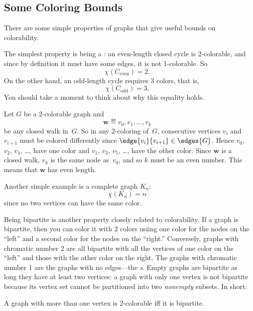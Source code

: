 \subsection{Some Coloring Bounds}

There are some simple properties of graphs that give useful bounds on
colorability. 
\begin{editingnotes}
\end{editingnotes} The simplest property is being a : an even-length
closed cycle is 2-colorable, and since by definition it must have some
edges, it is not 1-colorable.  So
\[
\chi(C_{\text{even}}) = 2.
\]
On the other hand, an odd-length cycle requires 3 colors, that is,
\begin{equation}\label{Codd3}
\chi(C_{\text{odd}}) = 3.
\end{equation}
You should take a moment to think about why this equality holds.
\begin{editingnotes}

Let $G$ be a 2-colorable graph and
\begin{equation*}
    \mathbf{w} \eqdef v_0, v_1, \dots, v_k
\end{equation*}
be any closed walk in~$G$.  So in any 2-coloring of~$G$, consecutive
vertices $v_i$ and $v_{i + 1}$ must be colored differently since
$\edge{v_i}{v_{i + 1}} \in \edges{G}$.  
Hence $v_0$, $v_2$, $v_4$, \dots, have one color and $v_1$, $v_3$,
$v_5$, \dots, have the other color.  Since $\mathbf{w}$ is a closed
walk, $v_k$ is the same node as~$v_0$, and so $k$ must be an even
number.  This means that $\mathbf{w}$ has even length.
\end{editingnotes}
Another simple example is a complete graph $K_n$:
\[
\chi(K_n) = n
\]
since no two vertices can have the same color.

Being bipartite is another property closely related to colorability.  If a
graph is bipartite, then you can color it with 2 colors usiing one color
for the nodes on the ``left'' and a second color for the nodes on the
``right.''  Conversely, graphs with chromatic number 2 are all bipartite
with all the vertices of one color on the ``left'' and those with the
other color on the right.  The graphs with chromatic number 1 are the
graphs with no edges---the \emph{s}.  Empty graphs are
bipartite as long they have at least two vertices: a graph with only one
vertex is not bipartite because its vertex set cannot be partitioned into
two \emph{nonempty} subsets.  In short:
\begin{lemma}\label{2color-iff-bip}
A graph with more than one vertex is 2-colorable iff it is
bipartite.
\end{lemma}

